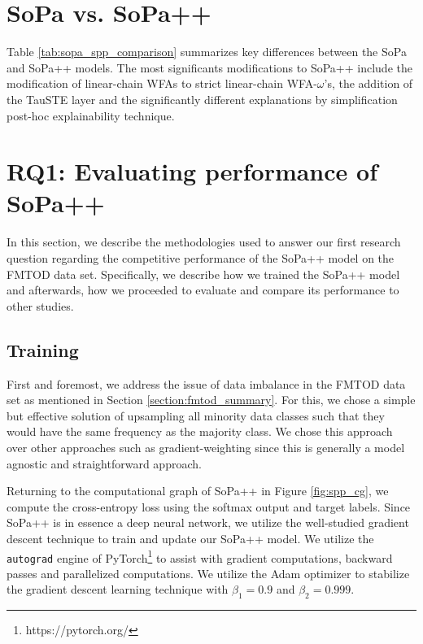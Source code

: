 \section{SoPa vs. SoPa++}

Table \ref{tab:sopa_spp_comparison} summarizes key differences between the SoPa
and SoPa++ models. The most significants modifications to SoPa++ include the
modification of linear-chain WFAs to strict linear-chain WFA-$\omega$'s, the
addition of the TauSTE layer and the significantly different explanations by
simplification post-hoc explainability technique.

\section{RQ1: Evaluating performance of SoPa++}

In this section, we describe the methodologies used to answer our first research
question regarding the competitive performance of the SoPa++ model on the FMTOD
data set. Specifically, we describe how we trained the SoPa++ model and
afterwards, how we proceeded to evaluate and compare its performance to other
studies.

\subsection{Training}

\label{section:spp_training}

First and foremost, we address the issue of data imbalance in the FMTOD data set
as mentioned in Section \ref{section:fmtod_summary}. For this, we chose a simple
but effective solution of upsampling all minority data classes such that they
would have the same frequency as the majority class. We chose this approach over
other approaches such as gradient-weighting since this is generally a model
agnostic and straightforward approach.

Returning to the computational graph of SoPa++ in Figure \ref{fig:spp_cg}, we
compute the cross-entropy loss using the softmax output and target labels. Since
SoPa++ is in essence a deep neural network, we utilize the well-studied gradient
descent technique to train and update our SoPa++ model. We utilize the
\texttt{autograd} engine of PyTorch\footnote{https://pytorch.org/} to assist
with gradient computations, backward passes and parallelized computations. We
utilize the Adam optimizer \citep{DBLP:journals/corr/KingmaB14} to stabilize the
gradient descent learning technique with $\beta_1=0.9$ and $\beta_2=0.999$.

